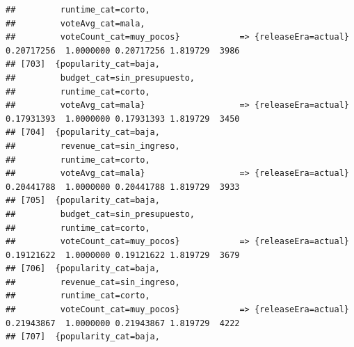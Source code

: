 \documentclass[
]{article}
\begin{document}
\begin{verbatim}
##         runtime_cat=corto,                                                                                                      
##         voteAvg_cat=mala,                                                                                                       
##         voteCount_cat=muy_pocos}            => {releaseEra=actual}               0.20717256  1.0000000 0.20717256 1.819729  3986
## [703]  {popularity_cat=baja,                                                                                                    
##         budget_cat=sin_presupuesto,                                                                                             
##         runtime_cat=corto,                                                                                                      
##         voteAvg_cat=mala}                   => {releaseEra=actual}               0.17931393  1.0000000 0.17931393 1.819729  3450
## [704]  {popularity_cat=baja,                                                                                                    
##         revenue_cat=sin_ingreso,                                                                                                
##         runtime_cat=corto,                                                                                                      
##         voteAvg_cat=mala}                   => {releaseEra=actual}               0.20441788  1.0000000 0.20441788 1.819729  3933
## [705]  {popularity_cat=baja,                                                                                                    
##         budget_cat=sin_presupuesto,                                                                                             
##         runtime_cat=corto,                                                                                                      
##         voteCount_cat=muy_pocos}            => {releaseEra=actual}               0.19121622  1.0000000 0.19121622 1.819729  3679
## [706]  {popularity_cat=baja,                                                                                                    
##         revenue_cat=sin_ingreso,                                                                                                
##         runtime_cat=corto,                                                                                                      
##         voteCount_cat=muy_pocos}            => {releaseEra=actual}               0.21943867  1.0000000 0.21943867 1.819729  4222
## [707]  {popularity_cat=baja,                                                                                                    

\end{verbatim}
\end{document}
